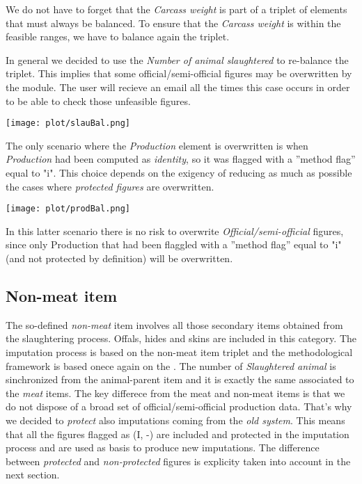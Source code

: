 \documentclass[nojss]{jss}
\begin{document}
We do not have to forget that the \textit{Carcass weight} is part of a triplet of elements that must always be balanced. To ensure that the \textit{Carcass weight} is within the feasible ranges, we have to balance again the triplet.

In general we decided to use the \textit{Number of animal slaughtered} to re-balance the triplet. This implies that some official/semi-official figures may be overwritten by the module. The user will recieve an email all the times this case occurs in order to be able to check those unfeasible figures.

\begin{center}
\texttt{[image: plot/slauBal.png]}
\end{center}


The only scenario where the \textit{Production} element is overwritten is when \textit{Production} had been computed as \textit{identity}, so it was flagged with a ''method flag'' equal to "i". This choice depends on the exigency of reducing as much as possible the cases where \textit{protected figures} are overwritten.

\begin{center}
\texttt{[image: plot/prodBal.png]}
\end{center}

In this latter scenario there is no risk to overwrite \textit{Official/semi-official} figures, since only Production that had been flaggled with a ''method flag'' equal to "i" (and not protected by definition) will be overwritten.


\subsection{Non-meat item}
The so-defined \textit{non-meat} item involves all those secondary items obtained from the slaughtering process. Offals, hides and skins are included in this category. The imputation process is based on the non-meat item triplet and the methodological framework is based onece again on the . The number of \textit{Slaughtered animal} is sinchronized from the animal-parent item and it is exactly the same associated to the \textit{meat} items. The key differece from the meat and non-meat items is that we do not dispose of a broad set of official/semi-official production data. That's why we decided to \textit{protect} also imputations coming from the \textit{old system}. This means that all the figures flagged as (I, -) are included and protected in the imputation process and are used as basis to produce new imputations. The difference between \textit{protected} and \textit{non-protected} figures is explicity taken into account in the next section.
\end{document}
